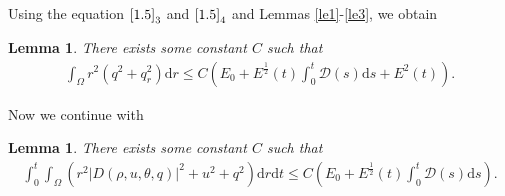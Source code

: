 \documentclass[11pt,reqno]{amsart}
\numberwithin{equation}{section}
\newtheorem{lemma}[theorem]{Lemma}
\newcommand{\dif}{\mathrm{d}}
\begin{document}
 Using the equation $\eqref{1.5}_3$ and $\eqref{1.5}_4$ and Lemmas \ref{le1}-\ref{le3}, we obtain
 \begin{lemma}\label{le4}
 There exists some constant $C$ such that
 \begin{align}\label{1.29}
 \int_{\Omega} r^2(q^2+q_r^2) \dif r \le C(E_0+E^\frac{1}{2}(t) \int_0^t \mathcal D(s) \dif s + E^2(t)).
 \end{align}
 \end{lemma}
 Now we continue with
 \begin{lemma}\label{le5}
  There exists some constant $C$ such that
\begin{align}\label{1.30}
\int_0^t \int_{\Omega}( r^2 |D(\rho, u, \theta, q)|^2 +u^2+q^2)\dif r \dif t \le C(E_0+E^\frac{1}{2}(t) \int_0^t  \mathcal D(s)\dif s).
\end{align}
\end{lemma}
\end{document}
